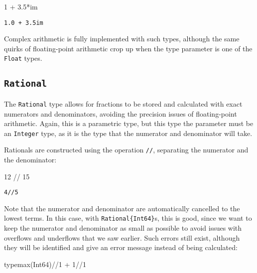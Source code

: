 \documentclass[
  letterpaper,
  DIV=11,
  numbers=noendperiod]{scrreprt}
\newenvironment{Shaded}{\begin{snugshade}}{\end{snugshade}}
\newcommand{\ConstantTok}[1]{\textcolor[rgb]{0.56,0.35,0.01}{#1}}
\newcommand{\DataTypeTok}[1]{\textcolor[rgb]{0.68,0.00,0.00}{#1}}
\newcommand{\FloatTok}[1]{\textcolor[rgb]{0.68,0.00,0.00}{#1}}
\newcommand{\FunctionTok}[1]{\textcolor[rgb]{0.28,0.35,0.67}{#1}}
\newcommand{\NormalTok}[1]{\textcolor[rgb]{0.00,0.23,0.31}{#1}}
\newcommand{\OperatorTok}[1]{\textcolor[rgb]{0.37,0.37,0.37}{#1}}
\begin{document}
\begin{Shaded}
\begin{Highlighting}[]
\FloatTok{1} \OperatorTok{+} \FloatTok{3.5}\OperatorTok{*}\ConstantTok{im}
\end{Highlighting}
\end{Shaded}

\begin{verbatim}
1.0 + 3.5im
\end{verbatim}

Complex arithmetic is fully implemented with such types, although the
same quirks of floating-point arithmetic crop up when the type parameter
is one of the \texttt{Float} types.

\hypertarget{rational}{%
\subsection{\texorpdfstring{\texttt{Rational}}{Rational}}\label{rational}}

The \texttt{Rational} type allows for fractions to be stored and
calculated with exact numerators and denominators, avoiding the
precision issues of floating-point arithmetic. Again, this is a
parametric type, but this type the parameter must be an \texttt{Integer}
type, as it is the type that the numerator and denominator will take.

Rationals are constructed using the operation \texttt{//}, separating
the numerator and the denominator:

\begin{Shaded}
\begin{Highlighting}[]
\FloatTok{12} \OperatorTok{//} \FloatTok{15}
\end{Highlighting}
\end{Shaded}

\begin{verbatim}
4//5
\end{verbatim}

Note that the numerator and denominator are automatically cancelled to
the lowest terms. In this case, with \texttt{Rational\{Int64\}}s, this
is good, since we want to keep the numerator and denominator as small as
possible to avoid issues with overflows and underflows that we saw
earlier. Such errors still exist, although they will be identified and
give an error message instead of being calculated:

\begin{Shaded}
\begin{Highlighting}[]
\FunctionTok{typemax}\NormalTok{(}\DataTypeTok{Int64}\NormalTok{)}\OperatorTok{//}\FloatTok{1} \OperatorTok{+} \FloatTok{1}\OperatorTok{//}\FloatTok{1}
\end{Highlighting}
\end{Shaded}
\end{document}
